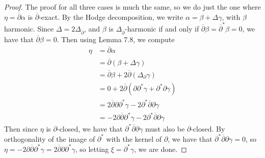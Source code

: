 \documentclass[psamsfonts, 12pt]{amsart}
\theoremstyle{definition}
\theoremstyle{remark}
\newcommand{\dbar}{\overline{\partial}}
\begin{document}
\begin{proof}
The proof for all three cases is much the same, so we do just the one where
$\eta = \dbar\alpha$ is $\dbar$-exact. By the Hodge decomposition, we write
$\alpha = \beta + \Delta\gamma$, with $\beta$ harmonic. Since
$\Delta = 2\Delta_{\dbar}$, and $\beta$ is $\Delta_{\dbar}$-harmonic if and only
if $\dbar\beta = \dbar^*\beta = 0$, we have that $\dbar\beta = 0$. Then
using Lemma 7.8, we compute
\begin{align*}
\eta &= \dbar\alpha \\
&= \dbar(\beta + \Delta\gamma) \\
&= \dbar\beta + 2\dbar(\Delta_\partial\gamma) \\
&= 0 + 2\dbar(\partial\partial^*\gamma + \partial^*\partial\gamma) \\
&= 2\dbar\partial\partial^*\gamma - 2\partial^*\dbar\partial\gamma \\
&= -2\partial\dbar\partial^*\gamma - 2\partial^*\dbar\partial\gamma
\end{align*}
Then since $\eta$ is $\partial$-closed, we have that $\partial^*\dbar\partial\gamma$
must also be $\partial$-closed. By orthogonality of the image of $\partial^*$ with
the kernel of $\partial$, we have that $\partial^*\dbar\partial\gamma = 0$,
so $\eta = -2\partial\dbar\partial^*\gamma = 2\dbar\partial\partial^*\gamma$,
so letting $\xi = \partial^*\gamma$, we are done.
\end{proof}
%
\end{document}
